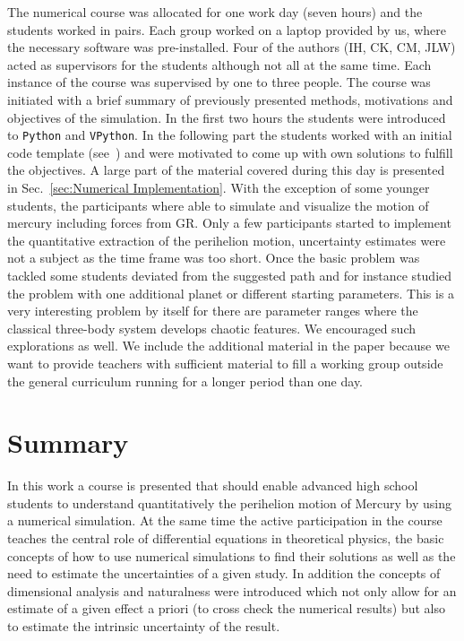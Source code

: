 \documentclass[12pt,ngerman,american]{iopart}
\newcommand{\python}[0]{\texttt{Python}}
\newcommand{\vpython}[0]{\texttt{VPython}}
\begin{document}
The numerical course was allocated for one work day (seven hours) and the students worked in pairs.
Each group worked on a laptop provided by us, where the necessary software was pre-installed.
Four of the authors (IH, CK, CM, JLW) acted as supervisors for the students although not all at the same time. Each instance of the course was supervised by one to three people.
The course was initiated with a brief summary of previously presented methods, motivations and objectives of the simulation.
In the first two hours the students were introduced to \python{} and \vpython{}.
In the following part the students worked with an initial code template (see~\cite{scripts}) and were motivated to come up with own solutions to fulfill the objectives.
A large part of the material covered during this day is presented in Sec.~\ref{sec:Numerical Implementation}.
With the exception of some younger students, the participants where able to simulate and visualize the motion of mercury including forces from GR.\@
Only a few participants started to implement the quantitative extraction of the perihelion motion, uncertainty estimates were not a subject as the time frame was too short.
Once the basic problem was tackled some students deviated from the suggested path and for instance studied the problem with one additional planet or different starting parameters.
This is a very interesting problem by itself for there are parameter ranges where the classical three-body system develops chaotic features.
We encouraged such explorations as well.
We include the additional material in the paper because we want to provide teachers with sufficient material to fill a working group outside the general curriculum running for a longer period than one day.


\section{Summary}

In this work a course is presented that should enable advanced high school students to understand quantitatively the perihelion motion of Mercury
by using a numerical simulation. At the same time the active participation in the course teaches the central role of
differential equations in theoretical physics, the basic concepts of how to use numerical simulations to find their
solutions as well as the need to estimate the uncertainties of a given study.
In addition the concepts of dimensional analysis and naturalness were introduced which not only allow for an
estimate of a given effect a priori (to cross check the numerical results) but also to estimate the intrinsic uncertainty
of the result.
\end{document}
